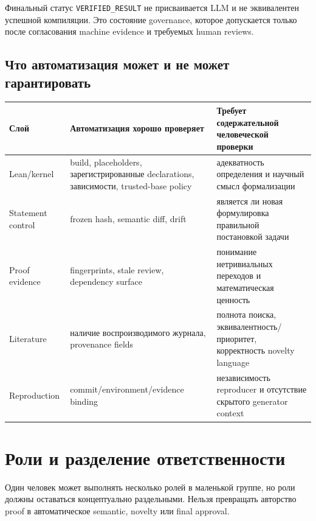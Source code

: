 \documentclass[11pt,a4paper]{article}
\newcommand{\status}[1]{\texttt{#1}}
\begin{document}
Финальный статус \status{VERIFIED\_RESULT} не присваивается LLM и не эквивалентен успешной компиляции. Это состояние governance, которое допускается только после согласования machine evidence и требуемых human reviews.

\subsection{Что автоматизация может и не может гарантировать}

\begin{tabularx}{\textwidth}{@{}p{}YY@{}}
\toprule
Слой & Автоматизация хорошо проверяет & Требует содержательной человеческой проверки \\
\midrule
Lean/kernel & build, placeholders, зарегистрированные declarations, зависимости, trusted-base policy & адекватность определения и научный смысл формализации \\
Statement control & frozen hash, semantic diff, drift & является ли новая формулировка правильной постановкой задачи \\
Proof evidence & fingerprints, stale review, dependency surface & понимание нетривиальных переходов и математическая ценность \\
Literature & наличие воспроизводимого журнала, provenance fields & полнота поиска, эквивалентность/приоритет, корректность novelty language \\
Reproduction & commit/environment/evidence binding & независимость reproducer и отсутствие скрытого generator context \\
\bottomrule
\end{tabularx}

\section{Роли и разделение ответственности}

Один человек может выполнять несколько ролей в маленькой группе, но роли должны оставаться концептуально раздельными. Нельзя превращать авторство proof в автоматическое semantic, novelty или final approval.
\end{document}
